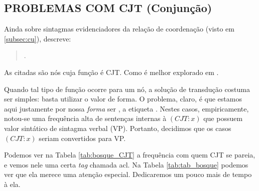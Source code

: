 \subsection{PROBLEMAS COM CJT (Conjunção)}
\label{subsec:CJT}
Ainda sobre sintagmas evidenciadores da relação de coordenação (visto em \ref{subsec:cu}),  descreve: 
\begin{quote}
    .
\end{quote}
As  citadas são nós cuja função é CJT. Como é melhor explorado em  .

Quando tal tipo de função ocorre para um nó, a solução de transdução costuma ser simples: basta utilizar o valor de forma. O problema, claro, é que estamos aqui justamente por nossa \textit{forma} ser , a etiqueta . Nestes casos, empiricamente, notou-se uma frequência alta de sentenças internas à $(CJT:x)$ que possuem valor sintático de sintagma verbal (VP). Portanto, decidimos que os casos $(CJT:x)$ seriam convertidos para VP.
\begin{center}
    
\end{center}
Podemos ver na Tabela \ref{tab:bosque_CJT} a frequência com quem CJT se pareia, e vemos nele uma certa \textit{tag} chamada acl. Na Tabela \ref{tab:tab_bosque} podemos ver que ela merece uma atenção especial. Dedicaremos um pouco mais de tempo à ela.
